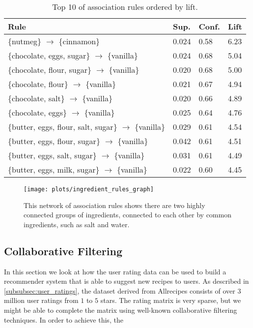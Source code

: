 \begin{table}[htbp]
	\caption{Top 10 of association rules ordered by lift.}
	\label{tab:rules_top10}
	
	\centering
	\begin{tabular}{l l l l}
		\toprule
		\textbf{Rule} & \textbf{Sup.} & \textbf{Conf.} & \textbf{Lift} \\
		\midrule
		\{nutmeg\} $\rightarrow$ \{cinnamon\} & 0.024 & 0.58 & 6.23 \\
		\{chocolate, eggs, sugar\} $\rightarrow$ \{vanilla\} & 0.024 & 0.68 & 5.04 \\
		\{chocolate, flour, sugar\} $\rightarrow$ \{vanilla\} & 0.020 & 0.68 & 5.00 \\
		\{chocolate, flour\} $\rightarrow$ \{vanilla\} & 0.021 & 0.67 & 4.94 \\
		\{chocolate, salt\} $\rightarrow$ \{vanilla\} & 0.020 & 0.66 & 4.89 \\
		\{chocolate, eggs\} $\rightarrow$ \{vanilla\} & 0.025 & 0.64 & 4.76 \\
		\{butter, eggs, flour, salt, sugar\} $\rightarrow$ \{vanilla\} & 0.029 & 0.61 & 4.54 \\
		\{butter, eggs, flour, sugar\} $\rightarrow$ \{vanilla\} & 0.042 & 0.61 & 4.51 \\
		\{butter, eggs, salt, sugar\} $\rightarrow$ \{vanilla\} & 0.031 & 0.61 & 4.49 \\
		\{butter, eggs, milk, sugar\} $\rightarrow$ \{vanilla\} & 0.022 & 0.60 & 4.45 \\
		\bottomrule
	\end{tabular}
	
\end{table}

\begin{figure}[htbp]
		
\end{figure}


\begin{figure}[htbp]
	\centering

	\texttt{[image: plots/ingredient\_rules\_graph]}
	
	\caption{This network of association rules shows there are two highly connected groups of ingredients, connected to each other by common ingredients, such as salt and water.}
	\label{fig:ingredient_rules_graph}
\end{figure}




\subsection{Collaborative Filtering}
\label{subsec:collaborative_filtering}

In this section we look at how the user rating data can be used to build a recommender system that is able to suggest new recipes to users.
As described in \cref{subsubsec:user_ratings}, the dataset derived from Allrecipes consists of over $3$ million user ratings from $1$ to $5$ stars.
The rating matrix is very sparse, but we might be able to complete the matrix using well-known collaborative filtering techniques.
In order to achieve this, the 